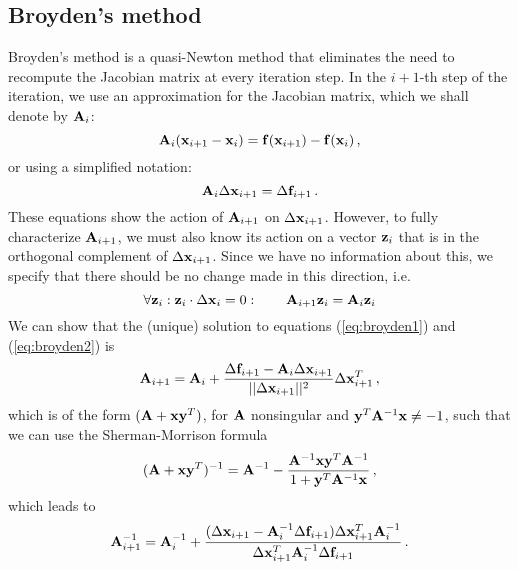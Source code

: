     \subsection{Broyden's method}
        Broyden's method \cite{burden2010, broyden1965} is a quasi-Newton method that eliminates the need to recompute the Jacobian matrix at every iteration step. In the $i+1$-th step of the iteration, we use an approximation for the Jacobian matrix, which we shall denote by $\vb{A}_i$:
        \begin{equation}
            \vb{A}_i (\vb{x}_{i+1} - \vb{x}_i) = \vb{f}(\vb{x}_{i+1}) - \vb{f}(\vb{x}_i) \thinspace ,
        \end{equation}
        or using a simplified notation:
        \begin{equation} \label{eq:broyden1}
            \vb{A}_i \Delta \vb{x}_{i+1} = \Delta \vb{f}_{i+1} \thinspace .
        \end{equation}
        These equations show the action of $\vb{A}_{i+1}$ on $\Delta \vb{x}_{i+1}$. However, to fully characterize $\vb{A}_{i+1}$, we must also know its action on a vector $\vb{z}_i$ that is in the orthogonal complement of $\Delta \vb{x}_{i+1}$. Since we have no information about this, we specify that there should be no change made in this direction, i.e.
        \begin{equation} \label{eq:broyden2}
            \forall \vb{z}_i: \vb{z}_i \cdot \Delta \vb{x}_{i} = 0: \qquad \vb{A}_{i+1} \vb{z}_i = \vb{A}_i \vb{z}_i
        \end{equation}
        We can show that the (unique) solution to equations (\ref{eq:broyden1}) and (\ref{eq:broyden2}) is
        \begin{equation}
            \vb{A}_{i+1} = \vb{A}_i + \frac{\Delta \vb{f}_{i+1} - \vb{A}_i \Delta \vb{x}_{i+1}}{|| \Delta \vb{x}_{i+1} ||^2} \Delta \vb{x}_{i+1}^T \thinspace ,
        \end{equation}
        which is of the form $(\vb{A} + \vb{x} \vb{y}^T)$, for $\vb{A}$ nonsingular and $\vb{y}^T \vb{A}^{-1} \vb{x} \neq -1$, such that we can use the Sherman-Morrison formula \cite{burden2010}
        \begin{equation}
            (\vb{A} + \vb{x} \vb{y}^T)^{-1} = \vb{A}^{-1} - \frac{\vb{A}^{-1} \vb{x} \vb{y}^T \vb{A}^{-1}}{1 + \vb{y}^T \vb{A}^{-1} \vb{x}} \thinspace ,
        \end{equation}
        which leads to
        \begin{equation} \label{eq:broyden_A_update}
            \vb{A}_{i+1}^{-1} = \vb{A}_i^{-1} + \frac{(\Delta \vb{x}_{i+1} - \vb{A}^{-1}_i \Delta \vb{f}_{i+1}) \Delta \vb{x}_{i+1}^T \vb{A}_i^{-1}}{\Delta \vb{x}^T_{i+1} \vb{A}^{-1}_i \Delta \vb{f}_{i+1}} \thinspace .
        \end{equation}
